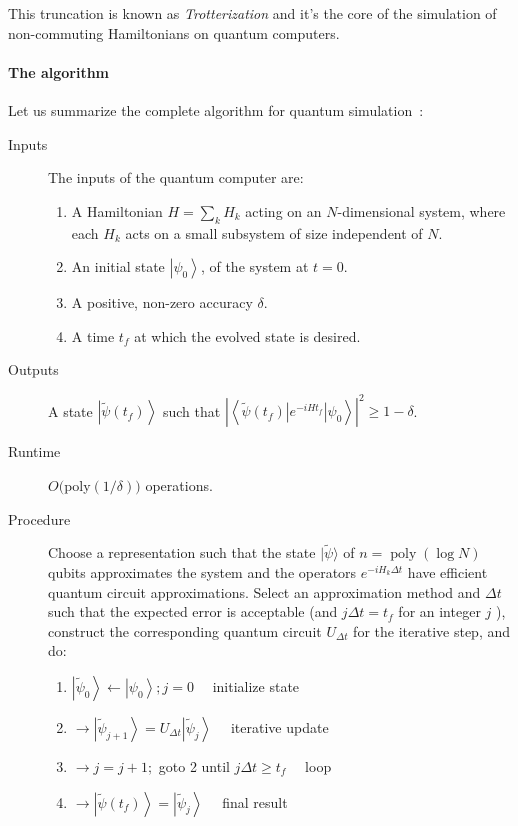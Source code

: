 This truncation is known as \emph{Trotterization} and it's the core of the simulation of non-commuting Hamiltonians on quantum computers.

\paragraph{The algorithm}
Let us summarize the complete algorithm for quantum simulation~\cite{NielsenChuang}:
\begin{description}
    \item[Inputs] The inputs of the quantum computer are:
     \begin{enumerate}
   \item A Hamiltonian $H=\sum_{k} H_{k}$ acting on an $N$-dimensional system, where each $H_{k}$ acts on a small subsystem of size independent of $N$.
   \item An initial state $\left|\psi_{0}\right\rangle$, of the system at $t=0$.
   \item A positive, non-zero accuracy $\delta$.
   \item A time $t_{f}$ at which the evolved state is desired.
 \end{enumerate}
    \item[Outputs] A state $\left|\tilde{\psi}\left(t_{f}\right)\right\rangle$ such that $\left|\left\langle\tilde{\psi}\left(t_{f}\right)\left|e^{-i H t_{f}}\right| \psi_{0}\right\rangle\right|^{2} \geq 1-\delta$.
    \item[Runtime] $O($poly$(1 / \delta))$ operations.
    \item[Procedure] Choose a representation such that the state $|\tilde{\psi}\rangle$ of $n=\operatorname{poly}(\log N)$ qubits approximates the system and the operators $e^{-i H_{k} \Delta t}$ have efficient quantum circuit approximations. Select an approximation method and $\Delta t$ such that the expected error is acceptable (and $j \Delta t=t_{f}$ for an integer $j$ ), construct the corresponding quantum circuit $U_{\Delta t}$ for the iterative step, and do:
    \begin{enumerate}
   \item $\left|\tilde{\psi}_{0}\right\rangle \leftarrow\left|\psi_{0}\right\rangle ; j=0 \quad$ initialize state
   \item $\rightarrow\left|\tilde{\psi}_{j+1}\right\rangle=U_{\Delta t}\left|\tilde{\psi}_{j}\right\rangle \quad$ iterative update
   \item $\rightarrow j=j+1 ;$ goto 2 until $j \Delta t \geq t_{f} \quad$ loop
   \item  $\rightarrow\left|\tilde{\psi}\left(t_{f}\right)\right\rangle=\left|\tilde{\psi}_{j}\right\rangle \quad$ final result
 \end{enumerate}
 \end{description}
